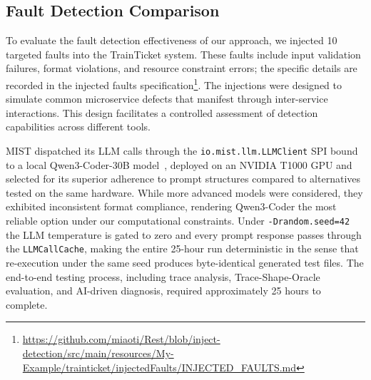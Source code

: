 \documentclass[conference]{IEEEtran}
\begin{document}


\subsection{Fault Detection Comparison}
To evaluate the fault detection effectiveness of our approach, we injected 10 targeted faults into the TrainTicket system. These faults include input validation failures, format violations, and resource constraint errors; the specific details are recorded in the injected faults specification\footnote{\url{https://github.com/miaoti/Rest/blob/inject-detection/src/main/resources/My-Example/trainticket/injectedFaults/INJECTED_FAULTS.md}}. The injections were designed to simulate common microservice defects that manifest through inter-service interactions. This design facilitates a controlled assessment of detection capabilities across different tools.

\textsc{MIST} dispatched its LLM calls through the
\texttt{io.mist.llm.LLMClient} SPI bound to a local Qwen3-Coder-30B
model~\cite{qwen2024}, deployed on an NVIDIA T1000 GPU and selected for
its superior adherence to prompt structures compared to alternatives
tested on the same hardware. While more advanced models were
considered, they exhibited inconsistent format compliance, rendering
Qwen3-Coder the most reliable option under our computational
constraints. Under \texttt{-Drandom.seed=42} the LLM temperature is
gated to zero and every prompt response passes through the
\texttt{LLMCallCache}, making the entire 25-hour run deterministic in
the sense that re-execution under the same seed produces byte-identical
generated test files. The end-to-end testing process, including trace
analysis, Trace-Shape-Oracle evaluation, and AI-driven diagnosis,
required approximately 25 hours to complete.
\end{document}
